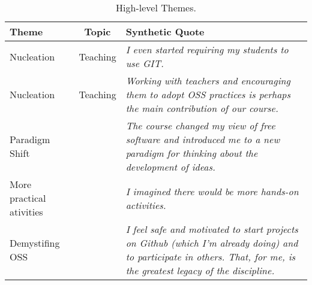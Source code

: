 \begin{table*}[htb]
    \centering
    \caption{High-level Themes.}
    \label{tab:themes}
    \begin{tabular}{l|c|p{12cm}}
    \hline
        Theme & Topic & Synthetic Quote \\
    \hline
         Nucleation & Teaching & \textit{I even started requiring my students to use GIT.}\\
         Nucleation & Teaching & \textit{Working with teachers and encouraging them to adopt OSS practices is perhaps the main contribution of our course.}\\
         Paradigm Shift &  & \textit{The course changed my view of free software and introduced me to a new paradigm for thinking about the development of ideas.}\\
         More practical ativities &  & \textit{I imagined there would be more hands-on activities.}\\
         Demystifing OSS & & \textit{I feel safe and motivated to start projects on Github (which I’m already doing) and to participate in others. That, for me, is the greatest legacy of the discipline.}\\
    \hline
    \end{tabular}
\end{table*}